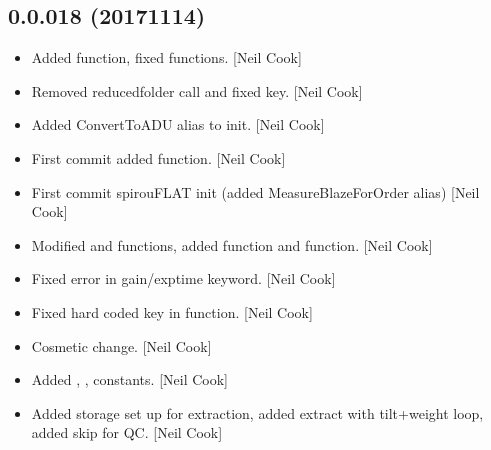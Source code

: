 \documentclass[a4paper,10pt,english]{report}
\begin{document}
\subsection{0.0.018 (2017\sphinxhyphen{}11\sphinxhyphen{}14)}
\label{\detokenize{misc/changelog:id551}}\begin{itemize}
\item {} 
Added  function, fixed 
functions. {[}Neil Cook{]}

\item {} 
Removed reducedfolder call and fixed  key. {[}Neil Cook{]}

\item {} 
Added ConvertToADU alias to init. {[}Neil Cook{]}

\item {} 
First commit  added  function.
{[}Neil Cook{]}

\item {} 
First commit spirouFLAT init (added MeasureBlazeForOrder alias) {[}Neil
Cook{]}

\item {} 
Modified  and  functions,
added  function and 
function. {[}Neil Cook{]}

\item {} 
Fixed error in gain/exptime keyword. {[}Neil Cook{]}

\item {} 
Fixed hard coded key in  function. {[}Neil Cook{]}

\item {} 
Cosmetic change. {[}Neil Cook{]}

\item {} 
Added , ,  constants. {[}Neil Cook{]}

\item {} 
Added storage set up for extraction, added extract with tilt+weight
loop, added skip for  QC. {[}Neil Cook{]}

\end{itemize}
\end{document}

